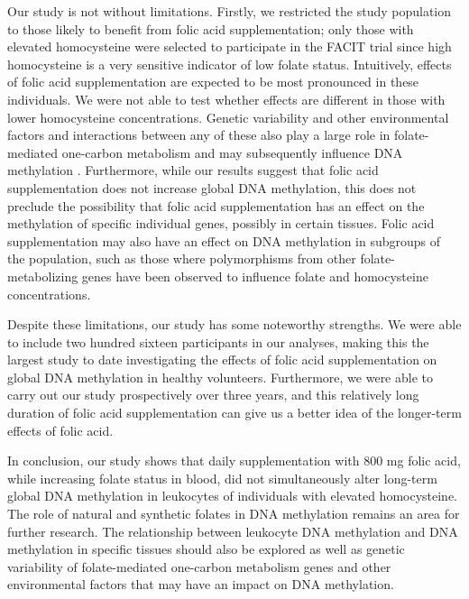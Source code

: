 \noindent Our study is not without limitations. Firstly, we restricted the study population to those likely to benefit from folic acid supplementation; only those with elevated homocysteine were selected to participate in the FACIT trial since high homocysteine is a very sensitive indicator of low folate status. Intuitively, effects of folic acid supplementation are expected to be most pronounced in these individuals. We were not able to test whether effects are different in those with lower homocysteine concentrations. Genetic variability and other environmental factors and interactions between any of these also play a large role in folate-mediated one-carbon metabolism \cite{c444} and may subsequently influence DNA methylation \cite{c445}. Furthermore, while our results suggest that folic acid supplementation does not increase global DNA methylation, this does not preclude the possibility that folic acid supplementation has an effect on the methylation of specific individual genes, possibly in certain 
tissues. Folic acid supplementation may also have an effect on DNA methylation in subgroups of the population, such as those where polymorphisms from other folate-metabolizing genes have been observed to influence folate \cite{c446} and homocysteine \cite{c446,c447} concentrations.

\noindent Despite these limitations, our study has some noteworthy strengths. We were able to include two hundred sixteen participants in our analyses, making this the largest study to date investigating the effects of folic acid supplementation on global DNA methylation in healthy volunteers. Furthermore, we were able to carry out our study prospectively over three years, and this relatively long duration of folic acid supplementation can give us a better idea of the longer-term effects of folic acid.

\noindent In conclusion, our study shows that daily supplementation with 800 mg folic acid, while increasing folate status in blood, did not simultaneously alter long-term global DNA methylation in leukocytes of individuals with elevated homocysteine. The role of natural and synthetic folates in DNA methylation remains an area for further research. The relationship between leukocyte DNA methylation and DNA methylation in specific tissues should also be explored as well as genetic variability of folate-mediated one-carbon metabolism genes and other environmental factors that may have an impact on DNA methylation.
 
